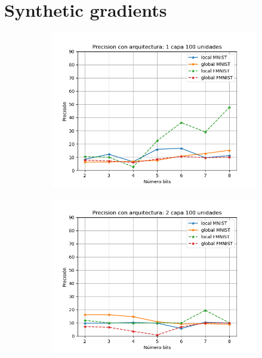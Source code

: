 \section{Synthetic gradients}
\begin{figure}[H]
    \centering
    \begin{subfigure}[H]{0.45\textwidth}
    \includegraphics[width=\textwidth]{imagenes/dni/Precision con arquitectura: 1 capa 100 unidades.png}
    \end{subfigure}
    \begin{subfigure}[H]{0.45\textwidth}
    \includegraphics[width=\textwidth]{imagenes/dni/Precision con arquitectura: 2 capa 100 unidades.png}
    \end{subfigure}

\end{figure}
